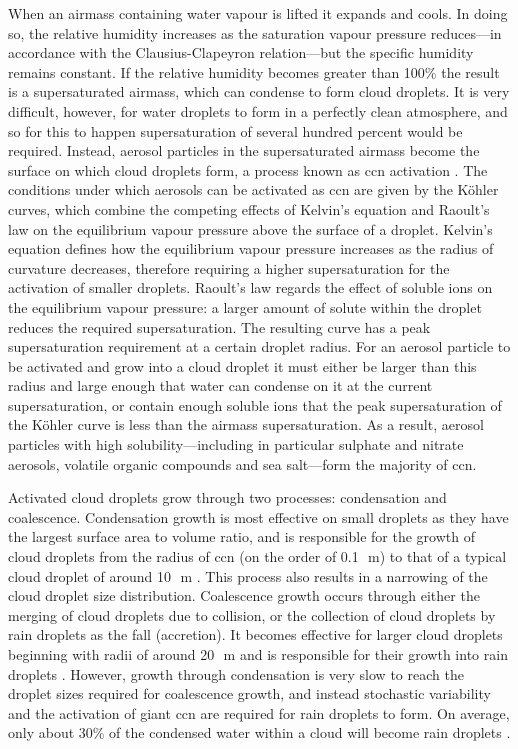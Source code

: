 When an airmass containing water vapour is lifted it expands and cools.
In doing so, the relative humidity increases as the saturation vapour pressure reduces---in accordance with the Clausius-Clapeyron relation---but the specific humidity remains constant. 
If the relative humidity becomes greater than 100\% the result is a supersaturated airmass, which can condense to form cloud droplets.
It is very difficult, however, for water droplets to form in a perfectly clean atmosphere, and so for this to happen supersaturation of several hundred percent would be required.
Instead, aerosol particles in the supersaturated airmass become the surface on which cloud droplets form, a process known as \acrfull{ccn} activation \citep{acci}.
The conditions under which aerosols can be activated as \acrshort{ccn} are given by the K{\"o}hler curves, which combine the competing effects of Kelvin's equation and Raoult's law on the equilibrium vapour pressure above the surface of a droplet. 
Kelvin's equation defines how the equilibrium vapour pressure increases as the radius of curvature decreases, therefore requiring a higher supersaturation for the activation of smaller droplets. 
Raoult's law regards the effect of soluble ions on the equilibrium vapour pressure: a larger amount of solute within the droplet reduces the required supersaturation. The resulting curve has a peak supersaturation requirement at a certain droplet radius. 
For an aerosol particle to be activated and grow into a cloud droplet it must either be larger than this radius and large enough that water can condense on it at the current supersaturation, or contain enough soluble ions that the peak supersaturation of the K{\"o}hler curve is less than the airmass supersaturation.
As a result, aerosol particles with high solubility---including in particular sulphate and nitrate aerosols, volatile organic compounds and sea salt---form the majority of \acrshort{ccn}.

Activated cloud droplets grow through two processes: condensation and coalescence. 
Condensation growth is most effective on small droplets as they have the largest surface area to volume ratio, and is responsible for the growth of cloud droplets from the radius of \acrshort{ccn} (on the order of 0.1\,\unit{\mu m}) to that of a typical cloud droplet of around 10\,\unit{\mu m} \citep{cloud_physics}. 
This process also results in a narrowing of the cloud droplet size distribution. 
Coalescence growth occurs through either the merging of cloud droplets due to collision, or the collection of cloud droplets by rain droplets as the fall (accretion).
It becomes effective for larger cloud droplets beginning with radii of around 20\,\unit{\mu m} and is responsible for their growth into rain droplets \citep{cloud_physics}.
However, growth through condensation is very slow to reach the droplet sizes required for coalescence growth, and instead stochastic variability and the activation of giant \acrshort{ccn} \citep{feingold_impact_1999} are required for rain droplets to form. 
On average, only about 30\% of the condensed water within a cloud will become rain droplets \citep{trenberth_changing_2003}.

